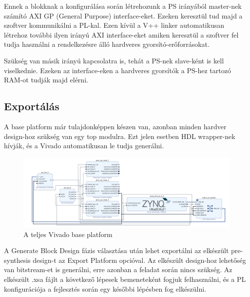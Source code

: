 Ennek a blokknak a konfigurálása során létrehozunk a PS irányából master-nek számító AXI GP (General Purpose) interface-eket. Ezeken keresztül tud majd a szoftver kommunikálni a PL-kal. Ezen kívül a V++ linker automatikusan létrehoz további ilyen irányú AXI interface-eket amiken keresztül a szoftver fel tudja használni a rendelkezésre álló hardveres gyorsító-erőforrásokat.

Szükség van másik irányú kapcsolatra is, tehát a PS-nek slave-ként is kell viselkednie. Ezeken az interface-eken a hardveres gyorsítók a PS-hez tartozó RAM-ot tudják majd elérni.

\subsection{Exportálás}
A base platform már tulajdonképpen készen van, azonban minden hardver design-hoz szükség van egy top modulra. Ezt jelen esetben HDL wrapper-nek hívják, és a Vivado automatikusan le tudja generálni.\\

\begin{figure}[!ht]
    \centering
    \includegraphics[width=150mm, keepaspectratio]{figures/base_platform.png}
    \caption{A teljes Vivado base platform}
\end{figure}

A Generate Block Design fázis választása után lehet exportálni az elkészült pre-synthesis design-t az Export Platform opcióval. Az elkészült design-hoz lehetőség van bitstream-et is generálni, erre azonban a feladat során nincs szükség. Az elkészült .xsa fájlt a következő lépesek bemeneteként fogjuk felhasználni, és a PL konfigurációja a fejlesztés során egy későbbi lépésben fog elkészülni.

